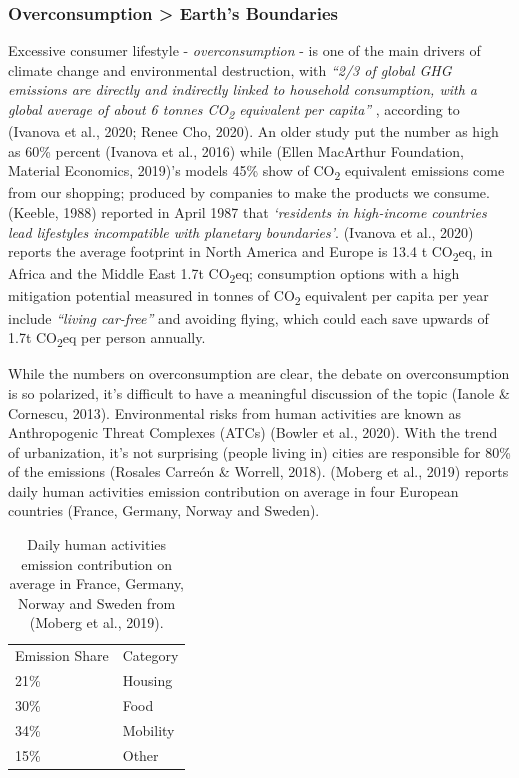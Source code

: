 \documentclass[
  12pt,
  letterpaper,
  DIV=11,
  numbers=noendperiod]{scrartcl}
\begin{document}
\let\pandoctableshortcapt\relax

\subsubsection{Overconsumption \textgreater{} Earth's
Boundaries}\label{overconsumption-earths-boundaries}

Excessive consumer lifestyle - \emph{overconsumption} - is one of the
main drivers of climate change and environmental destruction, with
\emph{``2/3 of global GHG emissions are directly and indirectly linked
to household consumption, with a global average of about 6 tonnes
CO\textsubscript{2} equivalent per capita''} , according to (Ivanova et
al., 2020; Renee Cho, 2020). An older study put the number as high as
60\% percent (Ivanova et al., 2016) while (Ellen MacArthur Foundation,
Material Economics, 2019)'s models 45\% show of CO\textsubscript{2}
equivalent emissions come from our shopping; produced by companies to
make the products we consume. (Keeble, 1988) reported in April 1987 that
\emph{`residents in high-income countries lead lifestyles incompatible
with planetary boundaries'}. (Ivanova et al., 2020) reports the average
footprint in North America and Europe is 13.4 t CO\textsubscript{2}eq,
in Africa and the Middle East 1.7t CO\textsubscript{2}eq; consumption
options with a high mitigation potential measured in tonnes of
CO\textsubscript{2} equivalent per capita per year include
\emph{``living car-free''} and avoiding flying, which could each save
upwards of 1.7t CO\textsubscript{2}eq per person annually.

While the numbers on overconsumption are clear, the debate on
overconsumption is so polarized, it's difficult to have a meaningful
discussion of the topic (Ianole \& Cornescu, 2013). Environmental risks
from human activities are known as Anthropogenic Threat Complexes (ATCs)
(Bowler et al., 2020). With the trend of urbanization, it's not
surprising (people living in) cities are responsible for 80\% of the
emissions (Rosales Carreón \& Worrell, 2018). (Moberg et al., 2019)
reports daily human activities emission contribution on average in four
European countries (France, Germany, Norway and Sweden).

\def\pandoctableshortcapt{Daily Human Activities' Emission Contribution}

\begin{longtable}[]{@{}ll@{}}
\caption[Daily Human Activities' Emission Contribution]{Daily human
activities emission contribution on average in France, Germany, Norway
and Sweden from (Moberg et al., 2019).}\tabularnewline
\toprule\noalign{}
\endfirsthead
\endhead
\bottomrule\noalign{}
\endlastfoot
Emission Share & Category \\
21\% & Housing \\
30\% & Food \\
34\% & Mobility \\
15\% & Other \\
\end{longtable}
\end{document}

